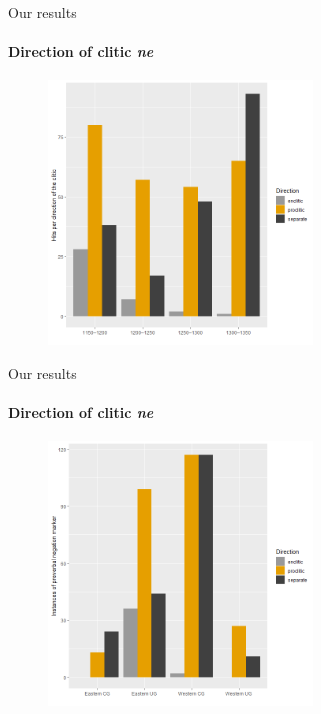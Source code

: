 \documentclass[xcolor=table, compress, %
handout
]{beamer}
\begin{document}
\begin{frame}{Our results}
\framesubtitle{Direction of clitic \textit{ne}}

\begin{figure}[h]
\centering
\includegraphics[width=7cm]{Clitic.png}
\end{figure}

\end{frame}

\begin{frame}{Our results}
\framesubtitle{Direction of clitic \textit{ne}}

\begin{figure}[h]
\centering
\includegraphics[width=7cm]{CliticD.png}
\end{figure}

\end{frame}
\end{document}
